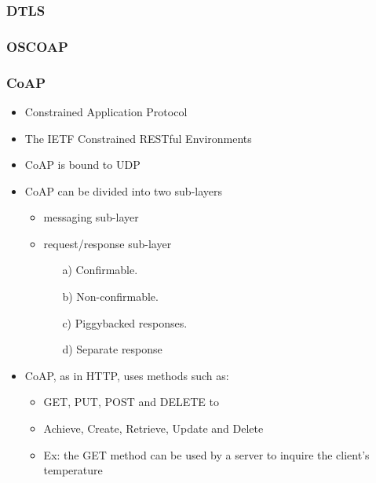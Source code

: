 \subsubsection{DTLS}
\subsubsection{OSCOAP}

\subsubsection{CoAP}

\begin{itemize}
	\item Constrained Application Protocol
	\item The IETF Constrained RESTful Environments
	\item CoAP is bound to UDP
	\item CoAP can be divided into two sub-layers
		\begin{itemize}
			\item messaging sub-layer
			\item request/response sub-layer
			\begin{itemize}
				\item[a)] Confirmable. 
				\item[b)] Non-confirmable. 
				\item[c)] Piggybacked responses. 
				\item[d)] Separate response
			\end{itemize}
		\end{itemize}
	\item CoAP, as in HTTP, uses methods such as:
	\begin{itemize}
		\item GET, PUT, POST and DELETE to 
		\item Achieve, Create, Retrieve, Update and Delete
	\end{itemize}
	\begin{itemize}
		\item Ex: the GET method can be used by a server to inquire the client’s temperature
	\end{itemize}
\end{itemize}

